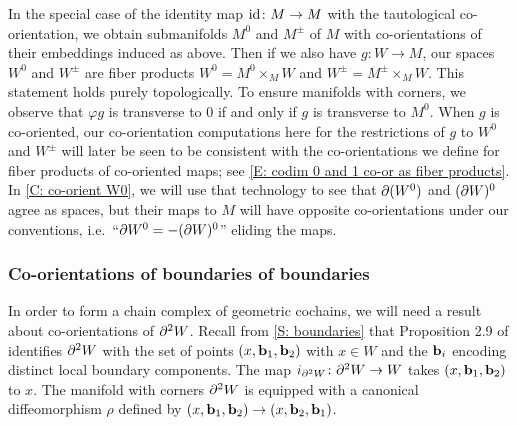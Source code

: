 \begin{example}
	In the special case of the identity map $\mathrm{id} \colon M \to M$ with the tautological co-orientation, we obtain submanifolds $M^0$ and $M^{\pm}$ of $M$ with co-orientations of their embeddings induced as above.
	Then if we also have $g \colon W \to M$, our spaces $W^0$ and $W^\pm$ are fiber products $W^0 = M^0 \times_M W$ and $W^{\pm} = M^{\pm} \times_M W$.
	This statement holds purely topologically.
	To ensure manifolds with corners, we observe that $\varphi g$ is transverse to $0$ if and only if $g$ is transverse to $M^0$.
	When $g$ is co-oriented, our co-orientation computations here for the restrictions of $g$ to $W^0$ and $W^\pm$ will later be seen to be consistent with the co-orientations we define for fiber products of co-oriented maps; see \cref{E: codim 0 and 1 co-or as fiber products}.
	In \cref{C: co-orient W0}, we will use that technology to see that $\partial (W^0)$ and $(\partial W)^0$ agree as spaces, but their maps to $M$ will have opposite co-orientations under our conventions, i.e.\ ``$\partial W^0 = -(\partial W)^0$'' eliding the maps.
\end{example}

\begin{comment}
	\red{TO DO SOMEWHERE: It will be convenient to show that $g \colon W^0 \to M$ with this co-orientation is the pullback of $M^0 \into M$ (co-oriented as defined here) and $g \colon W \to M$ and similarly for $g \colon W^\pm \to M$.
		Also need to rewrite things in other places as $M^0$, $M^\pm$, etc instead of always writing $\varphi^{-1}((\infty,0])$ etc.
		Also need to show that $\bd W^0 = -(\bd W)^0$, which should follow from the Leibniz rule and the first thing the previous sentence.}
\end{comment}

\subsubsection{Co-orientations of boundaries of boundaries}

In order to form a chain complex of geometric cochains, we will need a result about co-orientations of $\partial^2 W$.
Recall from \cref{S: boundaries} that Proposition 2.9 of \cite{Joy12} identifies $\partial^2 W$ with the set of points $(x,\mathbf{b}_1,\mathbf{b}_2)$ with $x \in W$ and the $\mathbf{b}_i$ encoding distinct local boundary components.
The map $i_{\partial^2 W} \colon \partial^2 W \to W$ takes $(x,\mathbf{b}_1,\mathbf{b}_2)$ to $x$.
The manifold with corners $\partial^2 W$ is equipped with a canonical diffeomorphism $\rho$ defined by $(x,\mathbf{b}_1,\mathbf{b}_2) \to (x,\mathbf{b}_2,\mathbf{b}_1)$.

